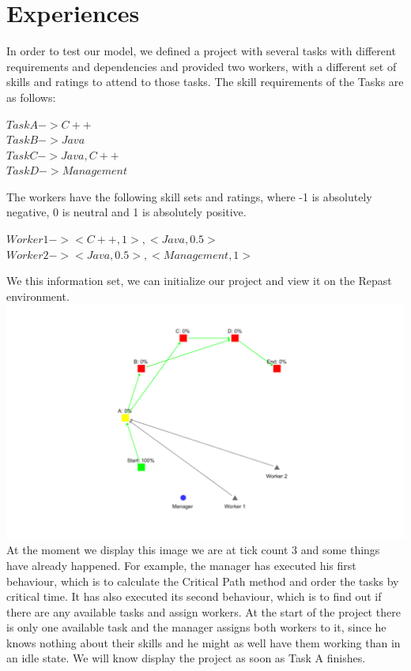 \documentclass[paper=a4, fontsize=11pt]{scrartcl} %
\numberwithin{equation}{section} %
\numberwithin{figure}{section} %
\numberwithin{table}{section} %
\begin{document}
\section{Experiences}
In order to test our model, we defined a project with several tasks with different requirements and dependencies and provided two workers, with a different set of skills and ratings to attend to those tasks. The skill requirements of the Tasks are as follows:
\begin{center}
	$Task A  ->  {C++}$
	\\
	$Task B  ->  {Java}$
	\\
	$Task C  ->  {Java,C++}$
	\\
	$Task D  ->  {Management}$
\end{center}
The workers have the following skill sets and ratings, where -1 is absolutely negative, 0 is neutral and 1 is absolutely positive.
\begin{center}
	$Worker 1  ->  {<C++,1>,<Java,0.5>}$
	\\
	$Worker 2  ->  {<Java,0.5>,<Management,1>}$
\end{center}
We this information set, we can initialize our project and view it on the Repast environment.
\includegraphics[scale=0.3]{exp1.png}
At the moment we display this image we are at tick count 3 and some things have already happened. For example, the manager has executed his first behaviour, which is to calculate the Critical Path method and order the tasks by critical time. It has also executed its second behaviour, which is to find out if there are any available tasks and assign workers. At the start of the project there is only one available task and the manager assigns both workers to it, since he knows nothing about their skills and he might as well have them working than in an idle state. We will know display the project as soon as Task A finishes.
\end{document}
